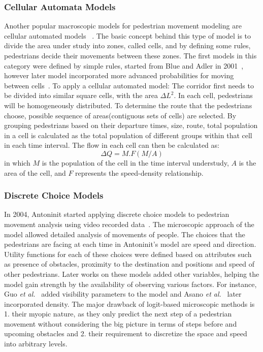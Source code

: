 \subsubsection{Cellular Automata Models}
Another popular macroscopic models for pedestrian movement modeling are cellular automated models ~\cite{blue2001cellular}. The basic concept behind this type of model is to divide the area under study into zones, called cells, and by defining some rules, pedestrians decide their movements between these zones. The first models in this category were defined by simple rules, started from Blue and Adler in 2001~\cite{blue2001cellular}, however later model incorporated more advanced probabilities for moving between cells~\cite{yamamoto2007simulation,weifeng2003simulation}.	
To apply a cellular automated model: The corridor first needs to be divided into similar square cells, with the area  \(\Delta L^2\). In each cell, pedestrians will be homogeneously distributed. To determine the route that the pedestrians choose, possible sequence of areas(contiguous sets of cells) are selected. By grouping pedestrians based on their departure times, size, route, total population in a cell is calculated as the total population of different groups within that cell in each time interval. The flow in each cell can then be calculated as: 
\begin{equation}
    \Delta Q=M.F(M/A)
\end{equation}
 in which $M$ is the population of the cell in the time interval understudy, $A$ is the area of the cell, and $F$ represents the speed-density relationship. 
 
\subsubsection{Discrete Choice Models}
In 2004, Antoninit started applying discrete choice models to pedestrian movement analysis using video recorded data~\cite{antonini2004simulation}. The microscopic approach of the model allowed detailed analysis of movements of people. The choices that the pedestrians are facing at each time in Antoninit's model are speed and direction. Utility functions for each of these choices were defined based on attributes such as presence of obstacles, proximity to the destination and positions and speed of other pedestrians. Later works on these models added other variables, helping the model gain strength by the availability of observing various factors. For instance, Guo \textit{et al.}~\cite{guo2012route} added visibility parameters to the model and Asano \textit{et al.}~\cite{asano2010microscopic} later incorporated density. The major drawback of logit-based microscopic methods is 1. their myopic nature, as they only predict the next step of a pedestrian movement without considering the big picture in terms of steps before and upcoming obstacles and 2. their requirement to discretize the space and speed into arbitrary levels.

